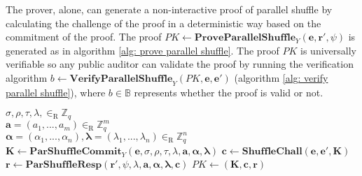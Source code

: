 The prover, alone, can generate a non-interactive proof of parallel shuffle by calculating the challenge of the proof in a deterministic way based on the commitment of the proof. The proof \( PK \leftarrow \mathbf{ProveParallelShuffle}_Y (\boldsymbol{e}, \boldsymbol{r'}, \psi) \) is generated as in algorithm \ref{alg: prove parallel shuffle}. The proof $PK$ is universally verifiable so any public auditor can validate the proof by running the verification algorithm \( b \leftarrow \mathbf{VerifyParallelShuffle}_Y (PK, \boldsymbol{e}, \boldsymbol{e'}) \) (algorithm \ref{alg: verify parallel shuffle}), where \( b \in \mathbb{B} \) represents  whether the proof is valid or not.

\begin{algorithm}[h]
\DontPrintSemicolon
    \caption{\( \mathbf{ProveParallelShuffle}_Y (\boldsymbol{e}, \boldsymbol{r'}, \psi) \)}
    \( \sigma, \rho, \tau, \lambda, \in_\mathrm{R} \mathbb{Z}_q \) \\
    \( \boldsymbol{a} = (a_1, ..., a_m) \in_\mathrm{R} \mathbb{Z}_q^m \) \\
    \( \boldsymbol{\alpha} = (\alpha_1, ..., \alpha_n), \boldsymbol{\lambda} = (\lambda_1, ..., \lambda_n) \in_\mathrm{R} \mathbb{Z}_q^n \) \\
    \( \boldsymbol{K} \gets \mathbf{ParShuffleCommit}_Y (\boldsymbol{e}, \sigma, \rho, \tau, \lambda, \boldsymbol{a}, \boldsymbol{\alpha}, \boldsymbol{\lambda}) \) 
    \( \boldsymbol{c} \gets \mathbf{ShuffleChall} (\boldsymbol{e}, \boldsymbol{e'}, \boldsymbol{K}) \) 
    \( \boldsymbol{r} \gets \mathbf{ParShuffleResp} (\boldsymbol{r'}, \psi, \lambda, \boldsymbol{a}, \boldsymbol{\alpha}, \boldsymbol{\lambda}, \boldsymbol{c}) \) 
    \( PK \gets (\boldsymbol{K}, \boldsymbol{c}, \boldsymbol{r}) \) \\
     
\end{algorithm}

